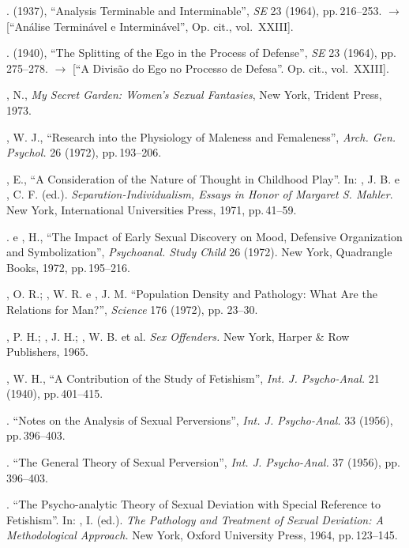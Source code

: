 \begin{description}
. (1937), ``Analysis Terminable and
Interminable'', \textit{SE }23 (1964), pp.\,216--253.
{$\bm{\rightarrow}$} [``Análise Terminável e Interminável'', Op. cit., vol.~XXIII].

. (1940), ``The Splitting of the Ego in the Process
of Defense'', \textit{SE }23 \textit{ }(1964), pp.\,275--278.
{$\bm{\rightarrow}$} [``A Divisão do Ego no Processo de Defesa''. Op. cit., vol.~XXIII].

, N., \textit{My Secret Garden: Women's Sexual
Fantasies}, New York, Trident Press, 1973.

, W. J., ``Research into the Physiology of Maleness and
Femaleness'', \textit{Arch. Gen. Psychol.} 26 (1972), pp.\,193--206.

, E., ``A Consideration of the Nature of Thought in
Childhood Play''. In: , J. B. e , C. F. (ed.). 
\textit{Separation-Individualism, Essays in
Honor of Margaret S. Mahler}. New York, International Universities Press, 1971, pp.\,41--59.

. e , H., ``The Impact of Early Sexual
Discovery on Mood, Defensive Organization and Symbolization'',
\textit{Psychoanal. Study Child }26 (1972). New York, Quadrangle
Books, 1972, pp.\,195--216.

, O. R.; , W. R. e , J. M. ``Population Density
and Pathology: What Are the Relations for Man?'', \textit{Science
}176 (1972), pp. 23--30.

, P. H.; , J. H.; , W. B. et al. \textit{Sex Offenders.
}New York, Harper \& Row Publishers, 1965.

, W. H., ``A Contribution of the Study of
Fetishism'', \textit{Int. J. Psycho-Anal. } 21 (1940), pp.\,401--415.

. ``Notes on the Analysis of Sexual
Perversions'', \textit{Int. J. Psycho-Anal. }33 (1956), pp.\,396--403.

. ``The General Theory of Sexual
Perversion'', \textit{Int. J. Psycho-Anal. }37 (1956), pp.\,396--403.

. ``The Psycho-analytic Theory of Sexual
Deviation with Special Reference to Fetishism''. In: , I. (ed.). \textit{The
Pathology and Treatment of Sexual Deviation: A Methodological Approach.} 
New York, Oxford University Press, 1964, pp.\,123--145.


\end{description}
